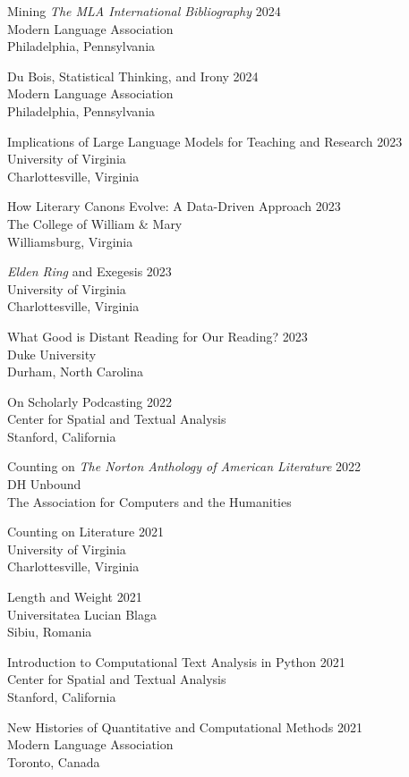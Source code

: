 \documentclass[
  12pt,
  letterpaper,
]{article}
\begin{document}
Mining \emph{The MLA International Bibliography} \hfill 2024\\
Modern Language Association\\
Philadelphia, Pennsylvania

Du Bois, Statistical Thinking, and Irony \hfill 2024\\
Modern Language Association\\
Philadelphia, Pennsylvania

Implications of Large Language Models for Teaching and Research \hfill 2023\\
University of Virginia\\
Charlottesville, Virginia

How Literary Canons Evolve: A Data-Driven Approach \hfill 2023\\
The College of William \& Mary\\
Williamsburg, Virginia

\emph{Elden Ring} and Exegesis \hfill 2023\\
University of Virginia\\
Charlottesville, Virginia

What Good is Distant Reading for Our Reading? \hfill 2023\\
Duke University\\
Durham, North Carolina

On Scholarly Podcasting \hfill 2022\\
Center for Spatial and Textual Analysis\\
Stanford, California

Counting on \emph{The Norton Anthology of American Literature} \hfill 2022\\
DH Unbound\\
The Association for Computers and the Humanities

Counting on Literature \hfill 2021\\
University of Virginia\\
Charlottesville, Virginia

Length and Weight \hfill 2021\\
Universitatea Lucian Blaga\\
Sibiu, Romania

Introduction to Computational Text Analysis in Python \hfill 2021\\
Center for Spatial and Textual Analysis\\
Stanford, California

New Histories of Quantitative and Computational Methods \hfill 2021\\
Modern Language Association\\
Toronto, Canada
\end{document}
